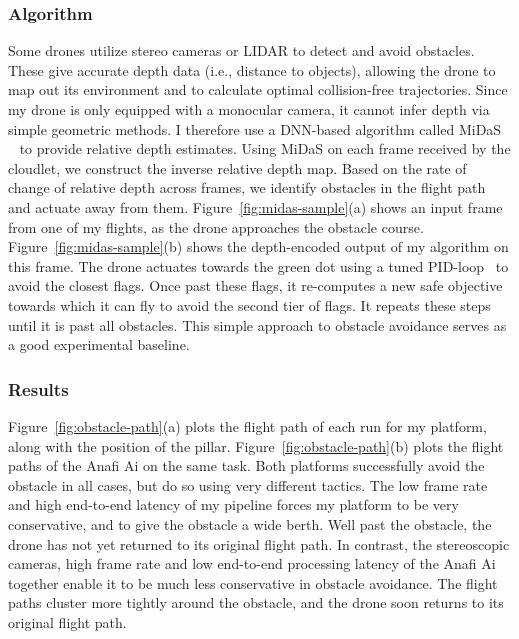 \subsubsection{Algorithm}
\label{sec:midas-algorithm}
Some drones utilize stereo cameras or LIDAR to detect and avoid
obstacles. These give accurate depth data (i.e., distance to objects),
allowing the drone to map out its environment and to calculate optimal
collision-free trajectories.  Since my drone is only equipped with a
monocular camera, it cannot infer depth via simple geometric methods.
I therefore use a DNN-based algorithm called MiDaS ~\cite{Ranftl2022}
to provide relative depth estimates.  Using MiDaS on each frame
received by the cloudlet, we construct the inverse relative depth map.
Based on the rate of change of relative depth across frames, we
identify obstacles in the flight path and actuate away from them.
Figure~\ref{fig:midas-sample}(a) shows an input frame from one of my
flights, as the drone approaches the obstacle course.
Figure~\ref{fig:midas-sample}(b) shows the depth-encoded output of my
algorithm on this frame.  The drone actuates towards the green dot
using a tuned PID-loop~\cite{Ang2005} to avoid the closest flags.
Once past these flags, it re-computes a new safe objective towards
which it can fly to avoid the second tier of flags.  It repeats these
steps until it is past all obstacles. This simple approach to obstacle
avoidance serves as a good experimental baseline.

\subsubsection{Results}
\label{sec:task5-results}

Figure~\ref{fig:obstacle-path}(a) plots the flight path of each run
for my platform, along with the position of the pillar.
Figure~\ref{fig:obstacle-path}(b) plots the flight paths of the Anafi
Ai on the same task.  Both platforms successfully avoid the obstacle
in all cases, but do so using very different tactics. The
low frame rate and high end-to-end latency of my pipeline forces my
platform to be very conservative, and to give the obstacle a wide
berth.  Well past the obstacle, the drone has not yet returned to its
original flight path.  In contrast, the stereoscopic cameras, high
frame rate and low end-to-end processing latency of the Anafi Ai
together enable it to be much less conservative in obstacle avoidance.
The flight paths cluster more tightly around the obstacle, and the drone
soon returns to its original flight path.

